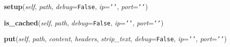    \label{Cache:FileCache:setup}

    \vspace{0.5ex}

\hspace{.8\funcindent}\begin{boxedminipage}{\funcwidth}

    \raggedright \textbf{setup}(\textit{self}, \textit{path}, \textit{debug}={\tt False}, \textit{ip}={\tt \texttt{'}\texttt{}\texttt{'}}, \textit{port}={\tt \texttt{'}\texttt{}\texttt{'}})

\setlength{\parskip}{2ex}
\setlength{\parskip}{1ex}
    \end{boxedminipage}

    \label{Cache:FileCache:is_cached}

    \vspace{0.5ex}

\hspace{.8\funcindent}\begin{boxedminipage}{\funcwidth}

    \raggedright \textbf{is\_cached}(\textit{self}, \textit{path}, \textit{debug}={\tt False}, \textit{ip}={\tt \texttt{'}\texttt{}\texttt{'}}, \textit{port}={\tt \texttt{'}\texttt{}\texttt{'}})

\setlength{\parskip}{2ex}
\setlength{\parskip}{1ex}
    \end{boxedminipage}

    \label{Cache:FileCache:put}

    \vspace{0.5ex}

\hspace{.8\funcindent}\begin{boxedminipage}{\funcwidth}

    \raggedright \textbf{put}(\textit{self}, \textit{path}, \textit{content}, \textit{headers}, \textit{strip\_text}, \textit{debug}={\tt False}, \textit{ip}={\tt \texttt{'}\texttt{}\texttt{'}}, \textit{port}={\tt \texttt{'}\texttt{}\texttt{'}})

\setlength{\parskip}{2ex}
\setlength{\parskip}{1ex}
    \end{boxedminipage}

